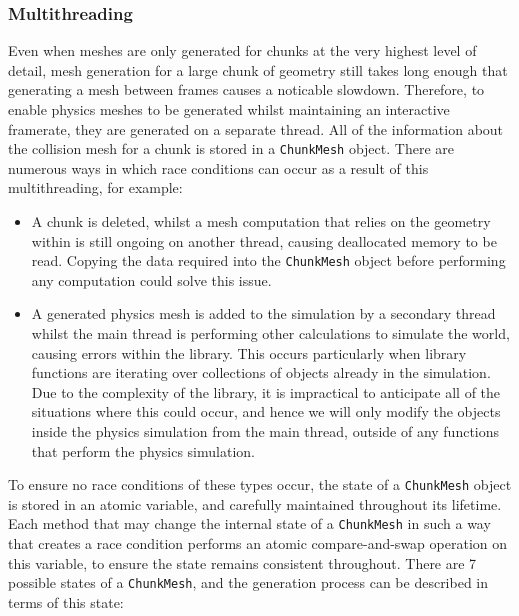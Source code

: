 \documentclass{article}
\begin{document}
\subsubsection{Multithreading}
Even when meshes are only generated for chunks at the very highest level of detail, mesh generation for a large chunk of geometry still takes long enough that generating a mesh between frames causes a noticable slowdown. Therefore, to enable physics meshes to be generated whilst maintaining an interactive framerate, they are generated on a separate thread. All of the information about the collision mesh for a chunk is stored in a \texttt{ChunkMesh} object. There are numerous ways in which race conditions can occur as a result of this multithreading, for example:
\begin{itemize}
  \item A chunk is deleted, whilst a mesh computation that relies on the geometry within is still ongoing on another thread, causing deallocated memory to be read. Copying the data required into the \texttt{ChunkMesh} object before performing any computation could solve this issue.
  \item A generated physics mesh is added to the simulation by a secondary thread whilst the main thread is performing other calculations to simulate the world, causing errors within the library. This occurs particularly when library functions are iterating over collections of objects already in the simulation. Due to the complexity of the library, it is impractical to anticipate all of the situations where this could occur, and hence we will only modify the objects inside the physics simulation from the main thread, outside of any functions that perform the physics simulation.
\end{itemize}
To ensure no race conditions of these types occur, the state of a \texttt{ChunkMesh} object is stored in an atomic variable, and carefully maintained throughout its lifetime. Each method that may change the internal state of a \texttt{ChunkMesh} in such a way that creates a race condition performs an atomic compare-and-swap operation on this variable, to ensure the state remains consistent throughout. There are 7 possible states of a \texttt{ChunkMesh}, and the generation process can be described in terms of this state:
\end{document}
